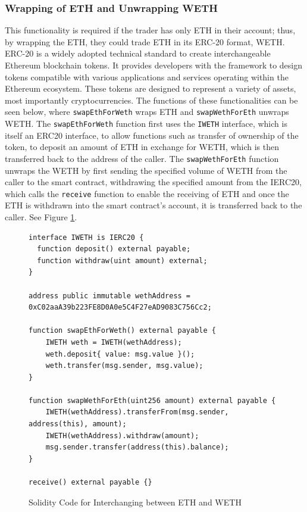 \subsubsection{Wrapping of ETH and Unwrapping WETH}
This functionality is required if the trader has only ETH in their account; thus, by wrapping the ETH, they could trade ETH in its ERC-20 format, WETH. ERC-20 is a widely adopted technical standard to create interchangeable Ethereum blockchain tokens. It provides developers with the framework to design tokens compatible with various applications and services operating within the Ethereum ecosystem. These tokens are designed to represent a variety of assets, most importantly cryptocurrencies. The functions of these functionalities can be seen below, where \texttt{swapEthForWeth} wraps ETH and \texttt{swapWethForEth} unwraps WETH. The \texttt{swapEthForWeth} function first uses the \texttt{IWETH} interface, which is itself an ERC20 interface, to allow functions such as transfer of ownership of the token, to deposit an amount of ETH in exchange for WETH, which is then transferred back to the address of the caller. The \texttt{swapWethForEth} function unwraps the WETH by first sending the specified volume of WETH from the caller to the smart contract, withdrawing the specified amount from the IERC20, which calls the \texttt{receive} function to enable the receiving of ETH and once the ETH is withdrawn into the smart contract's account, it is transferred back to the caller. See Figure \ref{fig:sol-code-eth-weth}.

\begin{figure}[htb!]
\begin{adjustwidth}{-0.5in}{-0.5in}
\begin{minipage}{\linewidth}
\centering
\begin{lstlisting}[language=Solidity]
interface IWETH is IERC20 {
  function deposit() external payable;
  function withdraw(uint amount) external;
}

address public immutable wethAddress = 0xC02aaA39b223FE8D0A0e5C4F27eAD9083C756Cc2;

function swapEthForWeth() external payable {
    IWETH weth = IWETH(wethAddress);
    weth.deposit{ value: msg.value }();
    weth.transfer(msg.sender, msg.value);
}

function swapWethForEth(uint256 amount) external payable {
    IWETH(wethAddress).transferFrom(msg.sender, address(this), amount);
    IWETH(wethAddress).withdraw(amount);
    msg.sender.transfer(address(this).balance);
}

receive() external payable {}
\end{lstlisting}
\end{minipage}
\end{adjustwidth}
\caption{Solidity Code for Interchanging between ETH and WETH \label{fig:sol-code-eth-weth}}
\end{figure}

